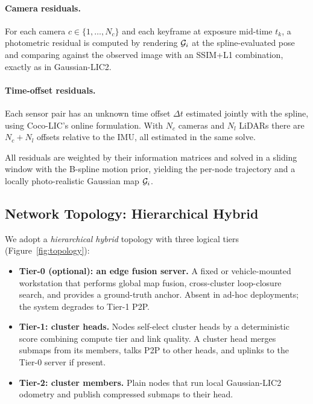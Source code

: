 \paragraph{Camera residuals.} For each camera $c \in \{1,\dots,N_c\}$ and each
keyframe at exposure mid-time $t_k$, a photometric residual is computed by
rendering $\mathcal{G}_i$ at the spline-evaluated pose and comparing against
the observed image with an SSIM+L1 combination, exactly as in Gaussian-LIC2.

\paragraph{Time-offset residuals.} Each sensor pair has an unknown time offset
$\Delta t$ estimated jointly with the spline, using Coco-LIC's online
formulation. With $N_c$ cameras and $N_l$ LiDARs there are
$N_c + N_l$ offsets relative to the IMU, all estimated in the same solve.

All residuals are weighted by their information matrices and solved in a
sliding window with the B-spline motion prior, yielding the per-node trajectory
and a locally photo-realistic Gaussian map $\mathcal{G}_i$.

\subsection{Network Topology: Hierarchical Hybrid}
\label{sec:topology}

We adopt a \emph{hierarchical hybrid} topology with three logical tiers
(Figure~\ref{fig:topology}):

\begin{itemize}
  \item \textbf{Tier-0 (optional): an edge fusion server.} A fixed or
    vehicle-mounted workstation that performs global map fusion, cross-cluster
    loop-closure search, and provides a ground-truth anchor. Absent in ad-hoc
    deployments; the system degrades to Tier-1 P2P.
  \item \textbf{Tier-1: cluster heads.} Nodes self-elect cluster heads by a
    deterministic score combining compute tier and link quality. A cluster head
    merges submaps from its members, talks P2P to other heads, and uplinks to
    the Tier-0 server if present.
  \item \textbf{Tier-2: cluster members.} Plain nodes that run local
    Gaussian-LIC2 odometry and publish compressed submaps to their head.
\end{itemize}

